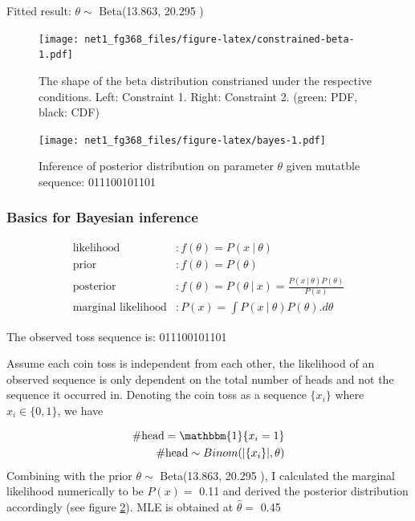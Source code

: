 \documentclass[]{article}
\newcommand{\indicator}{\mathbbm{1}}
\newcommand\gvn[1][]{\:#1\vert\:}
\theoremstyle{definition}
\theoremstyle{definition}
\theoremstyle{definition}
\theoremstyle{remark}
\begin{document}
Fitted result: \(\theta\sim\) Beta(13.863, 20.295 )

\begin{figure}
\centering
\texttt{[image: net1\_fg368\_files/figure-latex/constrained-beta-1.pdf]}
\caption{\label{fig:constrained-beta}The shape of the beta distribution
constrianed under the respective conditions. Left: Constraint 1. Right:
Constraint 2. (green: PDF, black: CDF)}
\end{figure}

\begin{figure}
\centering
\texttt{[image: net1\_fg368\_files/figure-latex/bayes-1.pdf]}
\caption{\label{fig:bayes}Inference of posterior distribution on parameter
\(\theta\) given mutatble sequence: 011100101101}
\end{figure}

\subsubsection{\texorpdfstring{Basics for Bayesian inference
\label{sec:bayes-basics}}{Basics for Bayesian inference }}\label{basics-for-bayesian-inference}

\[
\begin{aligned}
\text{likelihood}&: f(\theta) = P(x \gvn \theta) \\
\text{prior}&: f(\theta) = P(\theta) \\
\text{posterior}&: f(\theta)  = P(\theta \gvn x) = \frac{  P(x\gvn \theta) P(\theta)  }{P(x) } \\
\text{marginal likelihood} &: P(x) =  \int P(x\gvn \theta) P(\theta).d\theta
\end{aligned}
\]

The observed toss sequence is: 011100101101

Assume each coin toss is independent from each other, the likelihood of
an observed sequence is only dependent on the total number of heads and
not the sequence it occurred in. Denoting the coin toss as a sequence
\(\{x_i\}\) where \(x_i \in \{0,1\}\), we have

\[
\begin{aligned}
\text{\#head} = \indicator\{x_i=1\} \\
\text{\#head} \sim Binom(|\{x_i\}|,\theta)
\end{aligned}
\] Combining with the prior \(\theta\sim\) Beta(13.863, 20.295 ), I
calculated the marginal likelihood numerically to be \(P(x)=\) 0.11 and
derived the posterior distribution accordingly (see figure
\ref{fig:bayes}). MLE is obtained at \(\hat{\theta}=\) 0.45
\end{document}
